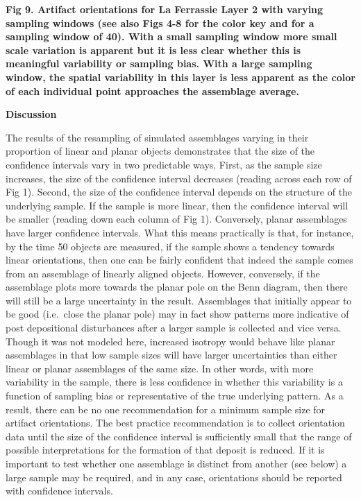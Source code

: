 \documentclass[]{article}
\begin{document}
\textbf{Fig 9. Artifact orientations for La Ferrassie Layer 2 with
varying sampling windows (see also Figs 4-8 for the color key and for a
sampling window of 40). With a small sampling window more small scale
variation is apparent but it is less clear whether this is meaningful
variability or sampling bias. With a large sampling window, the spatial
variability in this layer is less apparent as the color of each
individual point approaches the assemblage average.}

\textbf{Discussion}

The results of the resampling of simulated assemblages varying in their
proportion of linear and planar objects demonstrates that the size of
the confidence intervals vary in two predictable ways. First, as the
sample size increases, the size of the confidence interval decreases
(reading across each row of Fig 1). Second, the size of the confidence
interval depends on the structure of the underlying sample. If the
sample is more linear, then the confidence interval will be smaller
(reading down each column of Fig 1). Conversely, planar assemblages have
larger confidence intervals. What this means practically is that, for
instance, by the time 50 objects are measured, if the sample shows a
tendency towards linear orientations, then one can be fairly confident
that indeed the sample comes from an assemblage of linearly aligned
objects. However, conversely, if the assemblage plots more towards the
planar pole on the Benn diagram, then there will still be a large
uncertainty in the result. Assemblages that initially appear to be good
(i.e.~close the planar pole) may in fact show patterns more indicative
of post depositional disturbances after a larger sample is collected and
vice versa. Though it was not modeled here, increased isotropy would
behave like planar assemblages in that low sample sizes will have larger
uncertainties than either linear or planar assemblages of the same size.
In other words, with more variability in the sample, there is less
confidence in whether this variability is a function of sampling bias or
representative of the true underlying pattern. As a result, there can be
no one recommendation for a minimum sample size for artifact
orientations. The best practice recommendation is to collect orientation
data until the size of the confidence interval is sufficiently small
that the range of possible interpretations for the formation of that
deposit is reduced. If it is important to test whether one assemblage is
distinct from another (see below) a large sample may be required, and in
any case, orientations should be reported with confidence intervals.
\end{document}
